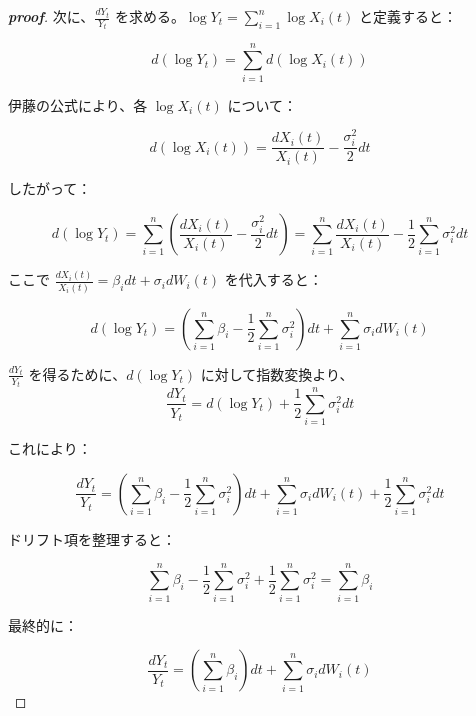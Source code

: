 \documentclass[a4paper,11pt]{jsarticle}
\begin{document}
\begin{proof}[\textbf{proof}]
  次に、$\frac{dY_t}{Y_t}$ を求める。$\log Y_t = \sum_{i=1}^n \log X_i(t)$ と定義すると：  

  \[  
  d(\log Y_t) = \sum_{i=1}^n d(\log X_i(t))  
  \]  
  
  伊藤の公式により、各 $\log X_i(t)$ について：  
  
  \[  
  d(\log X_i(t)) = \frac{dX_i(t)}{X_i(t)} - \frac{\sigma_i^2}{2}dt  
  \]  
  
  したがって：  
  
  \[  
  d(\log Y_t) = \sum_{i=1}^n \left(\frac{dX_i(t)}{X_i(t)} - \frac{\sigma_i^2}{2}dt\right) = \sum_{i=1}^n \frac{dX_i(t)}{X_i(t)} - \frac{1}{2}\sum_{i=1}^n \sigma_i^2dt  
  \]  
  
  ここで $\frac{dX_i(t)}{X_i(t)} = \beta_idt + \sigma_idW_i(t)$ を代入すると：  
  
  \[  
  d(\log Y_t) = \left(\sum_{i=1}^n \beta_i - \frac{1}{2}\sum_{i=1}^n \sigma_i^2\right)dt + \sum_{i=1}^n \sigma_idW_i(t)  
  \]  
  
  $\frac{dY_t}{Y_t}$ を得るために、$d(\log Y_t)$ に対して指数変換より、\\  
  
  \[  
  \frac{dY_t}{Y_t} = d(\log Y_t) + \frac{1}{2}\sum_{i=1}^n \sigma_i^2dt  
  \]  
  
  これにより：  
  
  \[  
  \frac{dY_t}{Y_t} = \left(\sum_{i=1}^n \beta_i - \frac{1}{2}\sum_{i=1}^n \sigma_i^2\right)dt + \sum_{i=1}^n \sigma_idW_i(t) + \frac{1}{2}\sum_{i=1}^n \sigma_i^2dt  
  \]  
  
  ドリフト項を整理すると：  
  
  \[  
  \sum_{i=1}^n \beta_i - \frac{1}{2}\sum_{i=1}^n \sigma_i^2 + \frac{1}{2}\sum_{i=1}^n \sigma_i^2 = \sum_{i=1}^n \beta_i  
  \]  
  
  最終的に：  
  
  \[  
  \frac{dY_t}{Y_t} = \left(\sum_{i=1}^n \beta_i\right)dt + \sum_{i=1}^n \sigma_idW_i(t)  
  \]
  
\end{proof}
\end{document}
